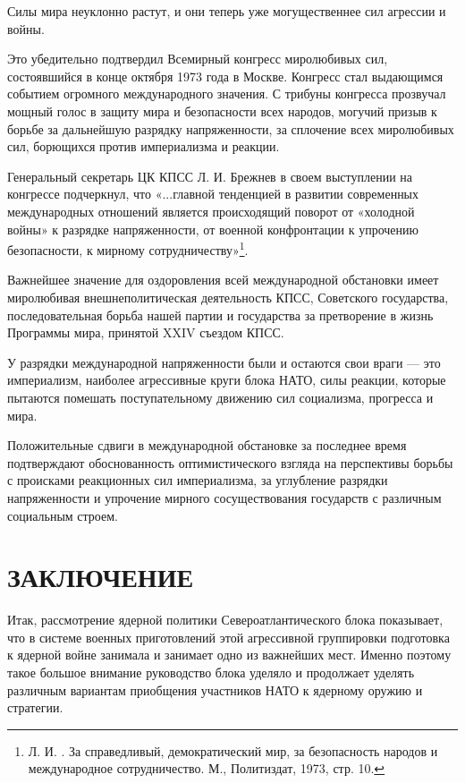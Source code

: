 \documentclass[12pt, a4paper, openany]{book}
\begin{document}
	Силы мира неуклонно растут, и они теперь уже могущественнее сил агрессии и войны.
	
	Это убедительно подтвердил Всемирный конгресс миролюбивых сил, состоявшийся в конце октября 1973 года в Москве. Конгресс стал выдающимся событием огромного международного значения. С трибуны конгресса прозвучал мощный голос в защиту мира и безопасности всех народов, могучий призыв к борьбе за дальнейшую разрядку напряженности, за сплочение всех миролюбивых сил, борющихся против империализма и реакции.
	
	Генеральный секретарь ЦК КПСС Л. И. Брежнев в своем выступлении на конгрессе подчеркнул, что «...главной тенденцией в развитии современных международных отношений является происходящий поворот от «холодной войны» к разрядке напряженности, от военной конфронтации к упрочению безопасности, к мирному сотрудничеству»{\footnote{Л. И. . За справедливый, демократический мир, за безопасность народов и международное сотрудничество. М., Политиздат, 1973, стр. 10.}}.
	
	Важнейшее значение для оздоровления всей международной обстановки имеет миролюбивая внешнеполитическая деятельность КПСС, Советского государства, последовательная борьба нашей партии и государства за претворение в жизнь Программы мира, принятой XXIV съездом КПСС.
	
	У разрядки международной напряженности были и остаются свои враги — это империализм, наиболее агрессивные круги блока НАТО, силы реакции, которые пытаются помешать поступательному движению сил социализма, прогресса и мира.
	
	Положительные сдвиги в международной обстановке за последнее время подтверждают обоснованность оптимистического взгляда на перспективы борьбы с происками реакционных сил империализма, за углубление разрядки напряженности и упрочение мирного сосуществования государств с различным социальным строем.
	
		\newpage
	\section[Заключение]{\center \textbf{ЗАКЛЮЧЕНИЕ}}	
	
	
	Итак, рассмотрение ядерной политики Североатлантического блока показывает, что в системе военных приготовлений этой агрессивной группировки подготовка к ядерной войне занимала и занимает одно из важнейших мест. Именно поэтому такое большое внимание руководство блока уделяло и продолжает уделять различным вариантам приобщения участников НАТО к ядерному оружию и стратегии.
	
\end{document}

